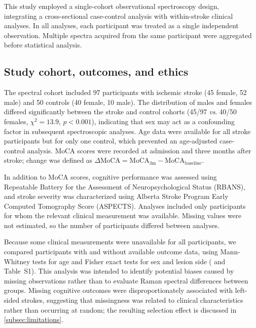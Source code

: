 \documentclass[preprint,12pt]{elsarticle}
\begin{document}
This study employed a single-cohort observational spectroscopy design, integrating a cross-sectional case-control analysis with within-stroke clinical analyses. In all analyses, each participant was treated as a single independent observation. Multiple spectra acquired from the same participant were aggregated before statistical analysis.

\subsection{Study cohort, outcomes, and ethics} 
\label{subsec:cohort}

The spectral cohort included 97 participants with ischemic stroke (45 female, 52 male) and 50 controls (40 female, 10 male).
The distribution of males and females differed significantly between the stroke and control cohorts (45/97 \textit{vs}. 40/50 females, $\chi^2 = 13.9$, $p < 0.001$), indicating that sex may act as a confounding factor in subsequent spectroscopic analyses. Age data were available for all stroke participants but for only one control, which prevented an age-adjusted case-control analysis. MoCA scores were recorded at admission and three months after stroke; change was defined as $\Delta\mathrm{MoCA}=\mathrm{MoCA}_{3\mathrm{m}}- \mathrm{MoCA}_{\mathrm{baseline}}$.

In addition to MoCA scores, cognitive performance was assessed using Repeatable Battery for the Assessment of Neuropsychological Status (RBANS), and stroke severity was characterized using Alberta Stroke Program Early Computed Tomography Score (ASPECTS). Analyses included only participants for whom the relevant clinical measurement was available. Missing values were not estimated, so the number of participants differed between analyses.

Because some clinical measurements were unavailable for all participants, we compared participants with and without available outcome data, using Mann-Whitney tests for age and Fisher exact tests for sex and lesion side ( and Table~S1). This analysis was intended to identify potential biases caused by missing observations rather than to evaluate Raman spectral differences between groups. Missing cognitive outcomes were disproportionately associated with left-sided strokes, suggesting that missingness was related to clinical characteristics rather than occurring at random; the resulting selection effect is discussed in \cref{subsec:limitations}.


\end{document}
